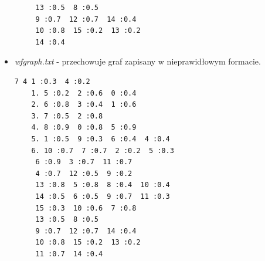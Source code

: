 \documentclass{article}
\begin{document}
\begin{itemize}
\begin{lstlisting}
	 13 :0.5  8 :0.5 
	 9 :0.7  12 :0.7  14 :0.4 
	 10 :0.8  15 :0.2  13 :0.2 
	 14 :0.4 
\end{lstlisting}

\newpage

\item \emph{wf\textunderscore graph.txt} - przechowuje graf zapisany w nieprawidłowym formacie.
\begin{lstlisting}
7 4 1 :0.3  4 :0.2 
	1. 5 :0.2  2 :0.6  0 :0.4 
	2. 6 :0.8  3 :0.4  1 :0.6
	3. 7 :0.5  2 :0.8 
	4. 8 :0.9  0 :0.8  5 :0.9 
	5. 1 :0.5  9 :0.3  6 :0.4  4 :0.4 
	6. 10 :0.7  7 :0.7  2 :0.2  5 :0.3 
	 6 :0.9  3 :0.7  11 :0.7 
	 4 :0.7  12 :0.5  9 :0.2 
	 13 :0.8  5 :0.8  8 :0.4  10 :0.4 
	 14 :0.5  6 :0.5  9 :0.7  11 :0.3 
	 15 :0.3  10 :0.6  7 :0.8 
	 13 :0.5  8 :0.5 
	 9 :0.7  12 :0.7  14 :0.4 
	 10 :0.8  15 :0.2  13 :0.2 
	 11 :0.7  14 :0.4 
\end{lstlisting}
\end{itemize}
\end{document}
